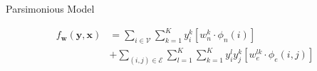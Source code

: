 \documentclass{beamer}
\newcommand{\x}{{\mathbf x}}     %
\newcommand{\y}{{\mathbf y}}     %
\newcommand{\ysc}[2]{{y_{#1}^{#2}}}    %
\newcommand{\fn}[1]{{\phi_n(#1)}}      %
\newcommand{\fe}[3]{{\phi_{#1}(#2,#3)}}%
\newcommand{\w}{{\mathbf w}}           %
\newcommand{\wn}[1]{{w_n^{#1}}}        %
\newcommand{\we}[3]{{w_{#1}^{#2#3}}}   %
\newcommand{\df}[3]{{f_{#3}(#1,#2)}}   %
\begin{document}

\begin{frame}{Parsimonious Model}

\begin{equation} \label{eq:model}
\begin{split}
\df{\y}{\x}{\w} & = \sum_{i \in \mathcal{V}} \sum_{k=1}^{K} \ysc{i}{k} \left[\wn{k} \cdot \fn{i} \right] \\
 & + \sum_{(i,j)\in \mathcal{E}}   \sum_{l=1}^{K}  \sum_{k=1}^{K} \ysc{i}{l} \ysc{j}{k}  \left[\we{e}{l}{k} \cdot \fe{e}{i}{j}\right] 
 \end{split}
\end{equation}

\end{frame}
\end{document}
